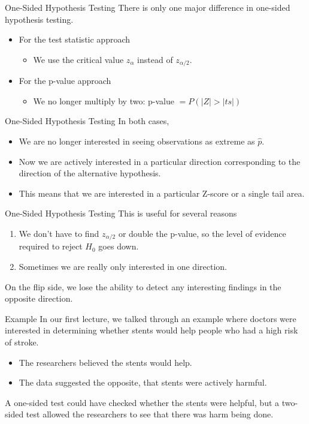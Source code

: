 \begin{frame}{One-Sided Hypothesis Testing}
    There is only one major difference in one-sided hypothesis testing.
    
    \begin{itemize}
        \item For the test statistic approach
        \begin{itemize}
            \item We use the critical value $z_{\alpha}$ instead of $z_{\alpha/2}$.
        \end{itemize}
        \item For the p-value approach
        \begin{itemize}
            \item We no longer multiply by two: p-value $= P(|Z| > |ts|)$
        \end{itemize}
    \end{itemize}
\end{frame}

\begin{frame}{One-Sided Hypothesis Testing}
    In both cases,
    \begin{itemize}
        \item We are no longer interested in seeing observations as extreme as $\hat{p}$.
        \item Now we are actively interested in a particular direction corresponding to the direction of the alternative hypothesis.
        \item This means that we are interested in a particular Z-score or a single tail area.
    \end{itemize}
\end{frame}

\begin{frame}{One-Sided Hypothesis Testing}
    This is useful for several reasons
    \begin{enumerate}
        \item We don't have to find $z_{\alpha/2}$ or double the p-value, so the level of evidence required to reject $H_0$ goes down. 
        \item Sometimes we are really only interested in one direction. 
    \end{enumerate}
    On the flip side, we lose the ability to detect any interesting findings in the opposite direction. 
\end{frame}

\begin{frame}{Example}
    In our first lecture, we talked through an example where doctors were interested in determining whether stents would help people who had a high risk of stroke. 
    \begin{itemize}
        \item The researchers believed the stents would help.
        \item The data suggested the opposite, that stents were actively harmful.
    \end{itemize}
    A one-sided test could have checked whether the stents were helpful, but a two-sided test allowed the researchers to see that there was harm being done.
\end{frame}

